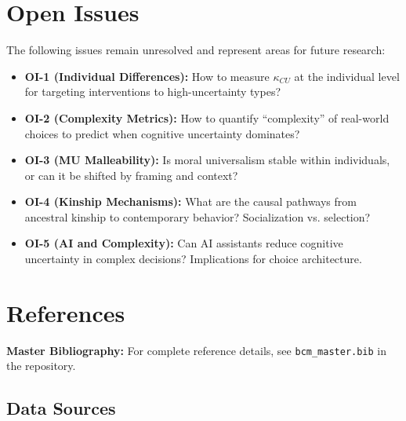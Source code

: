 \section{Open Issues}
\label{sec:enk-open-issues}

The following issues remain unresolved and represent areas for future research:

\begin{itemize}
    \item \textbf{OI-1 (Individual Differences):} How to measure $\kappa_{CU}$
    at the individual level for targeting interventions to high-uncertainty types?

    \item \textbf{OI-2 (Complexity Metrics):} How to quantify ``complexity'' of
    real-world choices to predict when cognitive uncertainty dominates?

    \item \textbf{OI-3 (MU Malleability):} Is moral universalism stable within
    individuals, or can it be shifted by framing and context?

    \item \textbf{OI-4 (Kinship Mechanisms):} What are the causal pathways from
    ancestral kinship to contemporary behavior? Socialization vs. selection?

    \item \textbf{OI-5 (AI and Complexity):} Can AI assistants reduce cognitive
    uncertainty in complex decisions? Implications for choice architecture.
\end{itemize}


\section{References}
\label{sec:enk-references}

\begin{tcolorbox}[colback=blue!5!white, colframe=blue!75!black]
\textbf{Master Bibliography:} For complete reference details, see
\texttt{bcm\_master.bib} in the repository.
\end{tcolorbox}

\subsection{Data Sources}


